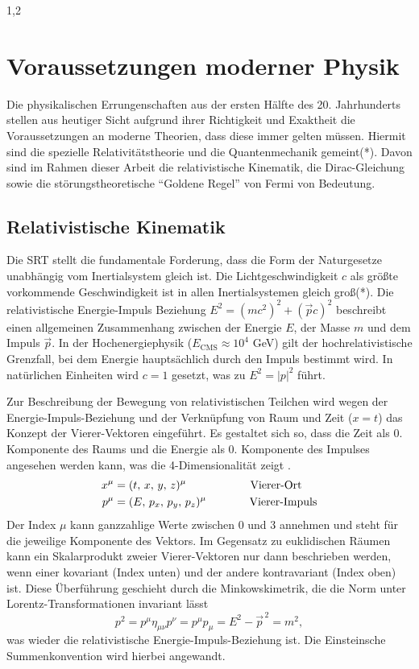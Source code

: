 \documentclass[11pt,a4paper,twoside]{report}
\begin{document}
\begin{spacing}{1,2}
\section{Voraussetzungen moderner Physik}
Die physikalischen Errungenschaften aus der ersten Hälfte des 20. Jahrhunderts stellen aus heutiger Sicht aufgrund ihrer Richtigkeit und Exaktheit die 
Voraussetzungen an moderne 
Theorien, dass diese immer gelten müssen. Hiermit sind die spezielle Relativitätstheorie und die Quantenmechanik gemeint(*). Davon sind im Rahmen dieser 
Arbeit die relativistische Kinematik, die Dirac-Gleichung sowie die störungstheoretische ``Goldene Regel'' von Fermi
von Bedeutung.

\subsection{Relativistische Kinematik}
Die SRT stellt die fundamentale Forderung, dass die Form der Naturgesetze unabhängig vom Inertialsystem gleich ist. Die Lichtgeschwindigkeit $c$ als
größte vorkommende Geschwindigkeit ist in allen Inertialsystemen gleich groß(*). Die relativistische Energie-Impuls Beziehung 
$E^2 = \left(mc^2\right)^2 + \left(\vec pc\right)^2$ beschreibt einen allgemeinen Zusammenhang zwischen der Energie $E$, der Masse $m$ und dem Impuls $\vec p$.
In der Hochenergiephysik ($E_{\text{CMS}} \approx 10^4$ GeV) gilt der hochrelativistische Grenzfall, bei dem Energie hauptsächlich durch den Impuls bestimmt wird.
In natürlichen Einheiten wird $c = 1$ gesetzt, was zu $E^2 = \left|p\right|^2$ führt.

Zur Beschreibung der Bewegung von relativistischen Teilchen wird wegen der Energie-Impuls-Beziehung und der Verknüpfung von Raum und Zeit ($x = t$) das Konzept
der Vierer-Vektoren eingeführt. Es gestaltet sich so, dass die Zeit als 0. Komponente des Raums und die Energie als 0. Komponente des Impulses angesehen werden
kann, was die 4-Dimensionalität zeigt \cite{RelKin}.
\begin{align}
 x^\mu &= (t,\,x,\,y,\,z)^\mu \hspace{2cm} \text{Vierer-Ort}\\
 p^\mu &= (E,\,p_x,\,p_y,\,p_z)^\mu \hspace{1.35cm} \text{Vierer-Impuls}
\end{align}
Der Index $\mu$ kann ganzzahlige Werte zwischen 0 und 3 annehmen und steht für die jeweilige Komponente des Vektors. Im Gegensatz zu euklidischen Räumen 
kann ein Skalarprodukt zweier Vierer-Vektoren nur dann beschrieben werden, wenn einer kovariant (Index unten) und der andere kontravariant (Index oben) ist.
Diese Überführung geschieht durch die Minkowskimetrik, die die Norm unter Lorentz-Transformationen invariant lässt
\begin{equation}
  p^2 = p^\mu \eta_{\mu \nu} p^\nu = p^\mu p_\mu = E^2 - \vec{p}^{\,2} = m^2,
\end{equation}
was wieder die relativistische Energie-Impuls-Beziehung ist. Die Einsteinsche Summenkonvention wird hierbei angewandt.

\end{spacing}
\end{document}
